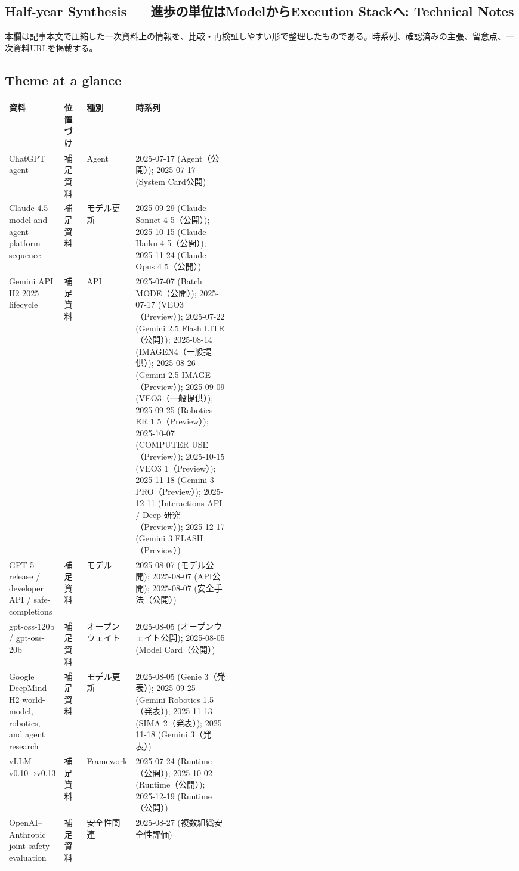\subsection*{Half-year Synthesis — 進歩の単位はModelからExecution Stackへ: Technical Notes}
本欄は記事本文で圧縮した一次資料上の情報を、比較・再検証しやすい形で整理したものである。時系列、確認済みの主張、留意点、一次資料URLを掲載する。
\medskip
\subsection*{Theme at a glance}
\begin{center}
\footnotesize
\begin{tabularx}{\linewidth}{@{}p{0.20\linewidth}p{0.10\linewidth}p{0.14\linewidth}X@{}}
\toprule
資料 & 位置づけ & 種別 & 時系列 \\
\midrule
ChatGPT agent & 補足資料 & Agent & 2025-07-17 (Agent（公開）); 2025-07-17 (System Card公開)    \\
Claude 4.5 model and agent platform sequence & 補足資料 & モデル更新 & 2025-09-29 (Claude Sonnet 4 5（公開）); 2025-10-15 (Claude Haiku 4 5（公開）); 2025-11-24 (Claude Opus 4 5（公開）)    \\
Gemini API H2 2025 lifecycle & 補足資料 & API & 2025-07-07 (Batch MODE（公開）); 2025-07-17 (VEO3（Preview）); 2025-07-22 (Gemini 2.5 Flash LITE（公開）); 2025-08-14 (IMAGEN4（一般提供）); 2025-08-26 (Gemini 2.5 IMAGE（Preview）); 2025-09-09 (VEO3（一般提供）); 2025-09-25 (Robotics ER 1 5（Preview）); 2025-10-07 (COMPUTER USE（Preview）); 2025-10-15 (VEO3 1（Preview）); 2025-11-18 (Gemini 3 PRO（Preview）); 2025-12-11 (Interactions API / Deep 研究（Preview）); 2025-12-17 (Gemini 3 FLASH（Preview）)    \\
GPT-5 release / developer API / safe-completions & 補足資料 & モデル & 2025-08-07 (モデル公開); 2025-08-07 (API公開); 2025-08-07 (安全手法（公開）)    \\
gpt-oss-120b / gpt-oss-20b & 補足資料 & オープンウェイト & 2025-08-05 (オープンウェイト公開); 2025-08-05 (Model Card（公開）)    \\
Google DeepMind H2 world-model, robotics, and agent research & 補足資料 & モデル更新 & 2025-08-05 (Genie 3（発表）); 2025-09-25 (Gemini Robotics 1.5（発表）); 2025-11-13 (SIMA 2（発表）); 2025-11-18 (Gemini 3（発表）)    \\
vLLM v0.10→v0.13 & 補足資料 & Framework & 2025-07-24 (Runtime（公開）); 2025-10-02 (Runtime（公開）); 2025-12-19 (Runtime（公開）)    \\
OpenAI–Anthropic joint safety evaluation & 補足資料 & 安全性関連 & 2025-08-27 (複数組織安全性評価)    \\
\bottomrule
\end{tabularx}
\end{center}
\normalsize

